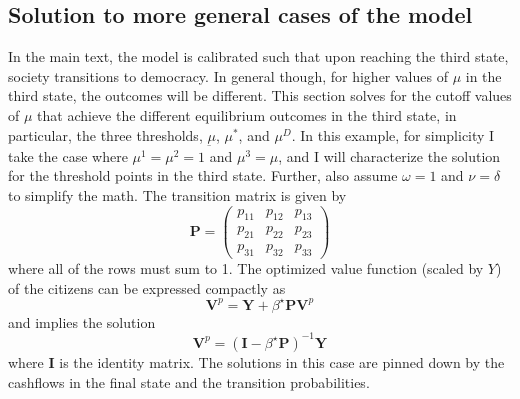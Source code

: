 \documentclass[12pt]{article}
\numberwithin{equation}{section}
\begin{document}
\subsection{Solution to more general cases of the model}\label{section:generalCase}

In the main text, the model is calibrated such that upon reaching the third state, society transitions to democracy. In general though, for higher values of $\mu$ in the third state, the outcomes will be different. This section solves for the cutoff values of $\mu$ that achieve the different equilibrium outcomes in the third state, in particular, the three thresholds, $\underbar{\ensuremath{\mu}}$, $\mu^{*}$, and $\mu^{D}$. In this example, for simplicity I take the case where $\mu^1 = \mu^2 = 1$ and $\mu^3 = \mu$, and I will characterize the solution for the threshold points in the third state. Further, also assume $\omega=1$ and $\nu=\delta$ to simplify the math. The transition matrix is given by
\begin{equation*}
\mathbf{P}=\begin{pmatrix}
p_{11} & p_{12} & p_{13} \\
p_{21} & p_{22} & p_{23} \\
p_{31} & p_{32} & p_{33} 
\end{pmatrix}
\end{equation*}
where all of the rows must sum to 1. The optimized value function (scaled by $Y$) of the citizens can be expressed compactly as
\begin{equation*}
\mathbf{V}^p = \mathbf{Y} + \beta^\star \mathbf{P}\mathbf{V}^p
\end{equation*}
and implies the solution
\begin{equation}
\mathbf{V}^p =(\mathbf{I}-\beta^\star \mathbf{P})^{-1} \mathbf{Y}
\end{equation}
where $\mathbf{I}$ is the identity matrix. The solutions in this case are pinned down by the cashflows in the final state and the transition probabilities.
\end{document}
